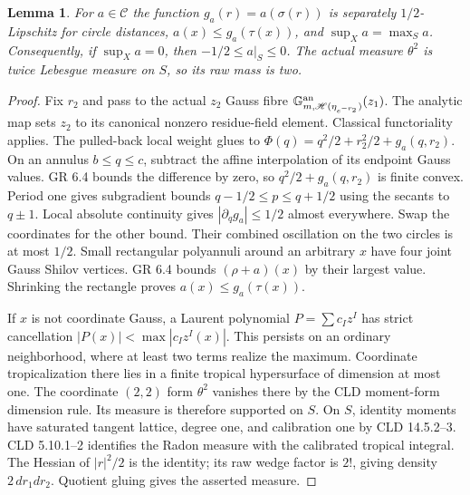 \documentclass[11pt]{article}
\newcommand{\C}{\mathcal C}
\newtheorem{lemma}[theorem]{Lemma}
\theoremstyle{remark}\newtheorem{remark}[theorem]{Remark}
\begin{document}
\begin{lemma}\label{gauss}
For $a\in\C$ the function $g_a(r)=a(\sigma(r))$ is separately
$1/2$-Lipschitz for circle distances, $a(x)\le g_a(\tau(x))$, and
$\sup_Xa=\max_Sa$. Consequently, if $\sup_Xa=0$, then
$-1/2\le a|_S\le0$. The actual measure $\theta^2$ is twice
Lebesgue measure on $S$, so its raw mass is two.
\end{lemma}
\begin{proof}
Fix $r_2$ and pass to the actual $z_2$ Gauss fibre
$\mathbb G_{m,\mathscr H(\eta_{e^{-r_2}})}^{\rm an}(z_1)$.
The analytic map sets $z_2$ to its canonical nonzero residue-field
element. Classical functoriality applies. The pulled-back local
weight glues to $\Phi(q)=q^2/2+r_2^2/2+g_a(q,r_2)$.
On an annulus $b\le q\le c$, subtract the affine interpolation
of its endpoint Gauss values. GR 6.4 bounds the difference by zero,
so $q^2/2+g_a(q,r_2)$ is finite convex. Period one gives subgradient
bounds $q-1/2\le p\le q+1/2$ using the secants to $q\pm1$.
Local absolute continuity gives $|\partial_qg_a|\le1/2$ almost
everywhere. Swap the coordinates for the other bound. Their combined
oscillation on the two circles is at most $1/2$.
Small rectangular polyannuli around an arbitrary $x$ have four
joint Gauss Shilov vertices. GR 6.4 bounds $(\rho+a)(x)$ by their
largest value. Shrinking the rectangle proves $a(x)\le g_a(\tau(x))$.

If $x$ is not coordinate Gauss, a Laurent polynomial $P=\sum c_Iz^I$
has strict cancellation $|P(x)|<\max|c_Iz^I(x)|$. This persists
on an ordinary neighborhood, where at least two terms realize
the maximum. Coordinate tropicalization there lies in a finite
tropical hypersurface of dimension at most one. The coordinate
$(2,2)$ form $\theta^2$ vanishes there by the CLD moment-form
dimension rule. Its measure is therefore supported on $S$.
On $S$, identity moments have saturated tangent lattice, degree one,
and calibration one by CLD 14.5.2--3. CLD 5.10.1--2 identifies the
Radon measure with the calibrated tropical integral. The Hessian of
$|r|^2/2$ is the identity; its raw wedge factor is $2!$, giving
density $2\,dr_1dr_2$. Quotient gluing gives the asserted measure.
\end{proof}
\end{document}
